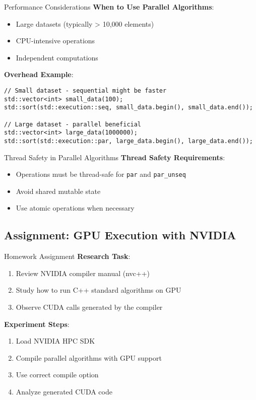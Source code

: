 \begin{frame}[fragile]{Performance Considerations}
	\textbf{When to Use Parallel Algorithms}:
	\begin{itemize}
		\item Large datasets (typically > 10,000 elements)
		\item CPU-intensive operations
		\item Independent computations
	\end{itemize}

	\textbf{Overhead Example}:
	\begin{verbatim}
// Small dataset - sequential might be faster
std::vector<int> small_data(100);
std::sort(std::execution::seq, small_data.begin(), small_data.end());

// Large dataset - parallel beneficial
std::vector<int> large_data(1000000);
std::sort(std::execution::par, large_data.begin(), large_data.end());
	\end{verbatim}
\end{frame}

\begin{frame}{Thread Safety in Parallel Algorithms}
	\textbf{Thread Safety Requirements}:
	\begin{itemize}
		\item Operations must be thread-safe for \texttt{par} and \texttt{par\_unseq}
		\item Avoid shared mutable state
		\item Use atomic operations when necessary
	\end{itemize}
\end{frame}

\subsection{Assignment: GPU Execution with NVIDIA}
\begin{frame}{Homework Assignment}
    \textbf{Research Task}:
    \begin{enumerate}
        \item Review NVIDIA compiler manual (nvc++)
        \item Study how to run C++ standard algorithms on GPU
        \item Observe CUDA calls generated by the compiler
    \end{enumerate}

    \textbf{Experiment Steps}:
    \begin{enumerate}
        \item Load NVIDIA HPC SDK
        \item Compile parallel algorithms with GPU support
        \item Use correct compile option
        \item Analyze generated CUDA code
    \end{enumerate}
\end{frame}

